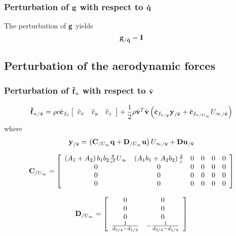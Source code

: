 \subsubsection{Perturbation of $\bm{\mathbf{g}}$ with respect to $\bm{\mathbf{\dot{q}}}$}
The perturbation of $\bm{\mathbf{g}}$ yields
\begin{equation}
\bm{\mathbf{g}}_{/{\bm{\mathbf{\dot{q}}}}} = \bm{\mathbf{I}}
\end{equation}

\subsection{Perturbation of the aerodynamic forces}

\subsubsection{Perturbation of $\bm{\mathbf{\tilde{f}}}_a$ with respect to $\tilde{\bm{\mathbf{v}}}$}


\begin{equation}
{\bm{\mathbf{\tilde{f}}}_a}_{/\tilde{\bm{\mathbf{v}}}} = 
	\rho c \tilde{\bm{\mathbf{c}}}_{f_{a}} \left[
		\begin{array}{ccc}
			\tilde{v}_x & \tilde{v}_y & \tilde{v}_z
		\end{array} \right] +
	\frac{1}{2} \rho \tilde{\bm{\mathbf{v}}}^T \tilde{\bm{\mathbf{v}}} 
	\left(  \tilde{\bm{\mathbf{c}}}_{{f_{a}}_{/\bm{\mathbf{y}}}} \bm{\mathbf{y}}_{/\tilde{\bm{\mathbf{v}}}} + 
	\tilde{\bm{\mathbf{c}}}_{{f_{a}}_{/U_{\infty}}} {U_\infty}_{/\tilde{\bm{\mathbf{v}}}}  \right) 
\end{equation}
where
\begin{equation}
\bm{\mathbf{y}}_{/\tilde{\bm{\mathbf{v}}}} = \left( 
	\bm{\mathbf{C}}_{/U_{\infty}} \bm{\mathbf{q}} + \bm{\mathbf{D}}_{/U_{\infty}} \bm{\mathbf{u}} \right) {U_\infty}_{/\tilde{\bm{\mathbf{v}}}}
	+ \bm{\mathbf{D}} \bm{\mathbf{u}}_{/\tilde{\bm{\mathbf{v}}}}
\end{equation}


\begin{equation}
\bm{\mathbf{C}}_{/U_\infty} = \left[
	\begin{array}{cccccc}
	\left(  A_1 + A_2 \right) b_1 b_2 \frac{8}{c^2} U_\infty & \left(  A_1 b_1 + A_2 b_2 \right) \frac{2}{c} & 0 & 0 & 0 & 0\\
	0 & 0 & 0 & 0 & 0 & 0\\
	0 & 0 & 0 & 0 & 0 & 0\\
	0 & 0 & 0 & 0 & 0 & 0\\
	\end{array}
	\right]
\end{equation}

\begin{equation}
\bm{\mathbf{D}}_{/U_\infty} = \left[
	\begin{array}{cc}
	0 & 0 \\
	0 & 0 \\
	0 & 0 \\
	\frac{1}{d_{3/4} - d_{1/4}} & 	-\frac{1}{d_{3/4} - d_{1/4}} \\
	\end{array}
	\right]
\end{equation}

